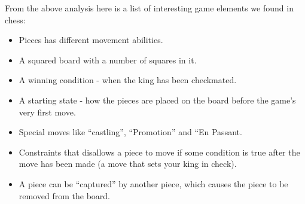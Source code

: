 
From the above analysis here is a list of interesting game elements we found in chess:
\begin{itemize}[noitemsep]
\item Pieces has different movement abilities.
\item A squared board with a number of squares in it.
\item A winning condition - when the king has been checkmated.
\item A starting state - how the pieces are placed on the board before the game's very first move.
\item Special moves like ``castling'', ``Promotion'' and ``En Passant.
\item Constraints that disallows a piece to move if some condition is true after the move has been made (a move that sets your king in check).
\item A piece can be ``captured'' by another piece, which causes the piece to be removed from the board.
\end{itemize}
